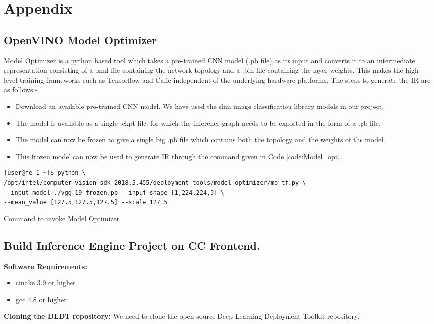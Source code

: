\appendix
\chapter{Appendix}

\section{OpenVINO Model Optimizer}
Model Optimizer is a python based tool which takes a pre-trained CNN model (.pb file) as its input and converts it to an intermediate representation consisting of a .xml file containing the network topology and a .bin file containing the layer weights. This makes the high level training frameworks such as Tensorflow and Caffe independent of the underlying hardware platforms. The steps to generate the IR are as follows:-

\begin{itemize}
    \item Download an available pre-trained CNN model. We have used the slim image classification library models in our project.
    \item The model is available as a single .ckpt file, for which the inference graph needs to be exported in the form of a .pb file.
    \item The model can now be frozen to give a single big .pb file which contains both the topology and the weights of the model.
    \item This frozen model can now be used to generate IR through the  command given in Code \ref{code:Model_opt}.
\end{itemize}

\begin{code}[!htb]
 \begin{verbatim}
[user@fe-1 ~]$ python \  
/opt/intel/computer_vision_sdk_2018.5.455/deployment_tools/model_optimizer/mo_tf.py \ 
--input_model ./vgg_19_frozen.pb --input_shape [1,224,224,3] \
--mean_value [127.5,127.5,127.5] --scale 127.5

\end{verbatim}
\caption{Command to invoke Model Optimizer}
\label{code:Model_opt}
\end{code}

\section{Build Inference Engine Project on CC Frontend.}
\textbf{Software Requirements:}
\begin{itemize}
\item cmake 3.9 or higher
\item gcc 4.8 or higher
\end{itemize}
\textbf{Cloning the DLDT repository:}
We need to clone the open source Deep Learning Deployment Toolkit repository.

